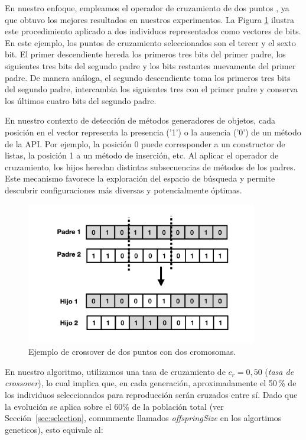 En nuestro enfoque, empleamos el operador de cruzamiento de dos puntos \cite{Goldberg:1989}, ya que obtuvo los mejores resultados en nuestros experimentos.  
La Figura \ref{fig:crossover} ilustra este procedimiento aplicado a dos individuos representados como vectores de bits.  
En este ejemplo, los puntos de cruzamiento seleccionados son el tercer y el sexto bit.  
El primer descendiente hereda los primeros tres bits del primer padre, los siguientes tres bits del segundo padre y los bits restantes nuevamente del primer padre.  
De manera análoga, el segundo descendiente toma los primeros tres bits del segundo padre, intercambia los siguientes tres con el primer padre y conserva los últimos cuatro bits del segundo padre.  

En nuestro contexto de detección de métodos generadores de objetos, cada posición en el vector representa la presencia ('1') o la ausencia ('0') de un método de la API.  
Por ejemplo, la posición 0 puede corresponder a un constructor de listas, la
posición 1 a un método de inserción, etc.  
Al aplicar el operador de cruzamiento, los hijos heredan distintas subsecuencias de métodos
de los padres. Este mecanismo favorece la exploración del espacio de búsqueda y permite descubrir configuraciones más diversas y potencialmente óptimas. 

\begin{figure}
  \centering
  \includegraphics[width=0.9\textwidth]{images/crossOver.png}
  \caption{Ejemplo de crossover de dos puntos con dos cromosomas.}
  \label{fig:crossover}
\end{figure}

En nuestro algoritmo, utilizamos una tasa de cruzamiento de \( c_r = 0{,}50 \) (\emph{tasa de crossover}), 
lo cual implica que, en cada generación, aproximadamente el 50\,\% de los individuos seleccionados para reproducción serán cruzados entre sí.  
Dado que la evolución se aplica sobre el 60\% de la población total (ver Sección~\ref{sec:selection}, comunmente llamados \emph{offspringSize} en los algortimos geneticos), esto equivale al:

